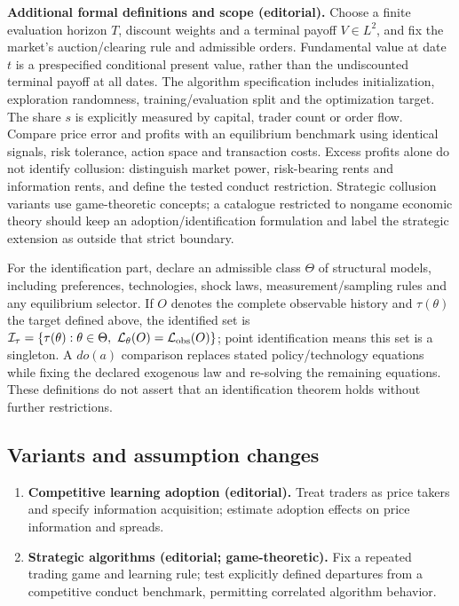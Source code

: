 \documentclass[11pt,a4paper]{article}
\begin{document}
\textbf{Additional formal definitions and scope (editorial).} Choose a finite evaluation horizon \(T\), discount weights and a terminal payoff \(V\in L^2\), and fix the market's auction/clearing rule and admissible orders. Fundamental value at date \(t\) is a prespecified conditional present value, rather than the undiscounted terminal payoff at all dates. The algorithm specification includes initialization, exploration randomness, training/evaluation split and the optimization target. The share \(s\) is explicitly measured by capital, trader count or order flow. Compare price error and profits with an equilibrium benchmark using identical signals, risk tolerance, action space and transaction costs. Excess profits alone do not identify collusion: distinguish market power, risk-bearing rents and information rents, and define the tested conduct restriction. Strategic collusion variants use game-theoretic concepts; a catalogue restricted to nongame economic theory should keep an adoption/identification formulation and label the strategic extension as outside that strict boundary.

For the identification part, declare an admissible class \(\Theta\) of structural models, including preferences, technologies, shock laws, measurement/sampling rules and any equilibrium selector. If \(O\) denotes the complete observable history and \(\tau(\theta)\) the target defined above, the identified set is \(\mathcal I_\tau=\{\tau(\theta):\theta\in\Theta,\ \mathcal L_\theta(O)=\mathcal L_{\rm obs}(O)\}\); point identification means this set is a singleton. A \(do(a)\) comparison replaces stated policy/technology equations while fixing the declared exogenous law and re-solving the remaining equations. These definitions do not assert that an identification theorem holds without further restrictions.
\subsection*{Variants and assumption changes}
\begin{enumerate}
\item \textbf{Competitive learning adoption (editorial).} Treat traders as price takers and specify information acquisition; estimate adoption effects on price information and spreads.
\item \textbf{Strategic algorithms (editorial; game-theoretic).} Fix a repeated trading game and learning rule; test explicitly defined departures from a competitive conduct benchmark, permitting correlated algorithm behavior.
\end{enumerate}
\end{document}
